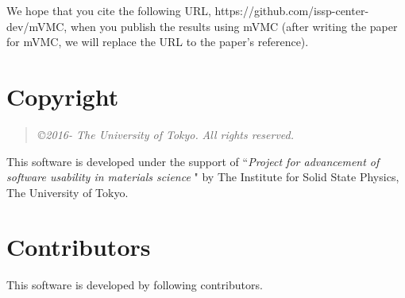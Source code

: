 We hope that you cite the following URL, https://github.com/issp-center-dev/mVMC,  when you publish the results using mVMC (after writing the paper for mVMC, we will replace the URL to the paper's reference).

\section{Copyright}
\begin{quote}
{\it \copyright  2016- The University of Tokyo.} {\it All rights reserved.}
\end{quote}
This software is developed under the support of ``{\it Project for advancement of software usability in materials science }" by The Institute for Solid State Physics, The University of Tokyo. 

\section{Contributors}
\label{subsec:developers}
This software is developed by following contributors.
